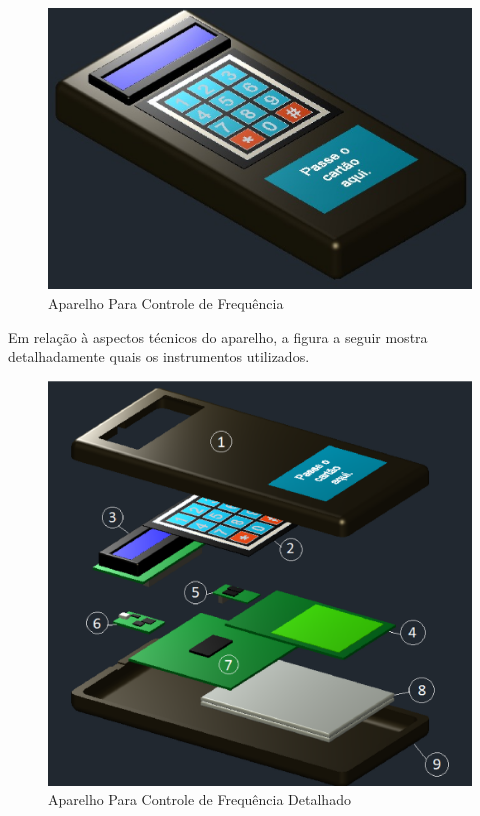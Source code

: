 \begin{figure}[!h]
  \centering
  \includegraphics[keepaspectratio=true,scale=0.45]{figuras/freq.eps}
  \caption{Aparelho Para Controle de Frequência}
\end{figure}

Em relação à aspectos técnicos do aparelho, a figura a seguir mostra detalhadamente quais os instrumentos utilizados.

\begin{figure}[h]
  \centering
  \includegraphics[keepaspectratio=true,scale=0.45]{figuras/aberto.eps}
  \caption{Aparelho Para Controle de Frequência Detalhado}
\end{figure}

